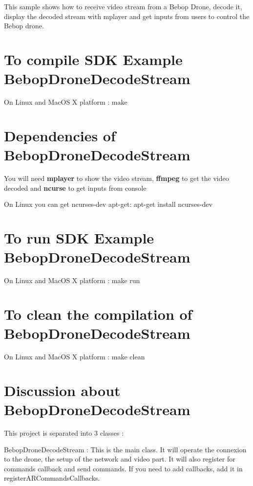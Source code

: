 This sample shows how to receive video stream from a Bebop Drone, decode it, display the decoded stream with mplayer and get inputs from users to control the Bebop drone.

\section*{To compile S\+D\+K Example Bebop\+Drone\+Decode\+Stream }

On Linux and Mac\+O\+S X platform \+: make

\section*{Dependencies of Bebop\+Drone\+Decode\+Stream }

You will need {\bfseries mplayer} to show the video stream, {\bfseries ffmpeg} to get the video decoded and {\bfseries ncurse} to get inputs from console

On Linux you can get ncurses-\/dev apt-\/get\+: apt-\/get install ncurses-\/dev

\section*{To run S\+D\+K Example Bebop\+Drone\+Decode\+Stream }

On Linux and Mac\+O\+S X platform \+: make run

\section*{To clean the compilation of Bebop\+Drone\+Decode\+Stream }

On Linux and Mac\+O\+S X platform \+: make clean

\section*{Discussion about Bebop\+Drone\+Decode\+Stream }

This project is separated into 3 classes \+:


\begin{DoxyItemize}
\item Bebop\+Drone\+Decode\+Stream \+: This is the main class. It will operate the connexion to the drone, the setup of the network and video part. It will also register for commands callback and send commands. If you need to add callbacks, add it in register\+A\+R\+Commands\+Callbacks.
\end{DoxyItemize}

